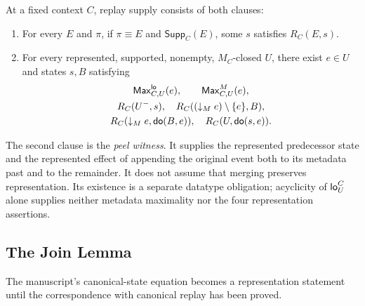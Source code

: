\begin{definition}\label{def:replay-supply}
At a fixed context $C$, replay supply consists of both clauses:
\begin{enumerate}[label=(\roman*),leftmargin=*,itemsep=.25em]
\item For every $E$ and $\pi$, if $\pi\equiv E$ and
$\mathsf{Supp}_C(E)$, some $s$ satisfies $R_C(E,s)$.
\item For every represented, supported, nonempty, $M_C$-closed $U$, there
exist $e\in U$ and states $s,B$ satisfying
\[
\begin{gathered}
 \mathsf{Max}^{\mathsf{lo}}_{C,U}(e),\qquad\mathsf{Max}^{M}_{C,U}(e),\\
 R_C(U^-,s),\quad R_C((\downarrow_M e)\setminus\{e\},B),\\
 R_C(\downarrow_M e,\mathsf{do}(B,e)),\quad R_C(U,\mathsf{do}(s,e)).
\end{gathered}
\]
\end{enumerate}
The second clause is the \emph{peel witness}. It supplies the represented predecessor state and the represented effect of
appending the original event both to its metadata past and to the remainder.
It does not assume that merging preserves representation. Its existence is a
separate datatype obligation; acyclicity of $\mathsf{lo}^C_U$ alone supplies neither
metadata maximality nor the four representation assertions.
\end{definition}

\subsection{The Join Lemma}\label{sec:join}

The manuscript's canonical-state equation becomes a representation statement
until the correspondence with canonical replay has been proved.

